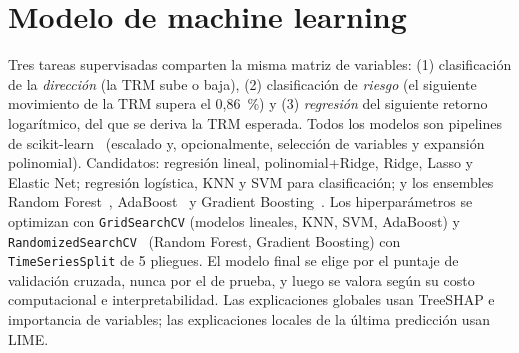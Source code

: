 \documentclass[conference]{IEEEtran}
\begin{document}
\section{Modelo de machine learning}
Tres tareas supervisadas comparten la misma matriz de variables: (1) clasificación de la \emph{dirección} (la TRM sube o baja), (2) clasificación de \emph{riesgo} (el siguiente movimiento de la TRM supera el 0,86~\%) y (3) \emph{regresión} del siguiente retorno logarítmico, del que se deriva la TRM esperada. Todos los modelos son pipelines de scikit-learn~\cite{pedregosa2011} (escalado y, opcionalmente, selección de variables y expansión polinomial). Candidatos: regresión lineal, polinomial+Ridge, Ridge, Lasso y Elastic Net; regresión logística, KNN y SVM para clasificación; y los ensembles Random Forest~\cite{breiman2001}, AdaBoost~\cite{freund1997} y Gradient Boosting~\cite{friedman2001}. Los hiperparámetros se optimizan con \texttt{GridSearchCV} (modelos lineales, KNN, SVM, AdaBoost) y \texttt{RandomizedSearchCV}~\cite{bergstra2012} (Random Forest, Gradient Boosting) con \texttt{TimeSeriesSplit} de 5 pliegues. El modelo final se elige por el puntaje de validación cruzada, nunca por el de prueba, y luego se valora según su costo computacional e interpretabilidad. Las explicaciones globales usan TreeSHAP e importancia de variables; las explicaciones locales de la última predicción usan LIME.
\end{document}
